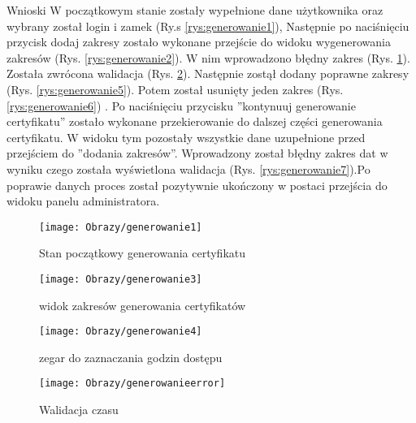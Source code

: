 \begin{enumerate*}
	Wnioski W początkowym stanie zostały wypełnione dane użytkownika oraz wybrany został login i zamek (Ry.s \ref{rys:generowanie1}), Następnie po naciśnięciu przycisk dodaj zakresy zostało wykonane przejście do widoku  wygenerowania zakresów (Rys. \ref{rys:generowanie2}). W nim wprowadzono  błędny zakres (Rys. \ref{rys:generowanie3}). Została zwrócona walidacja (Rys. \ref{rys:generowanie4}). Następnie zostął dodany poprawne zakresy (Rys. \ref{rys:generowanie5}). Potem został usunięty jeden zakres (Rys. \ref{rys:generowanie6})   . Po naciśnięciu przycisku ''kontynuuj generowanie certyfikatu'' zostało wykonane przekierowanie  do dalszej części generowania certyfikatu. W widoku tym pozostały wszystkie dane uzupełnione przed przejściem do ''dodania zakresów''. Wprowadzony został błędny zakres dat w wyniku czego została wyświetlona walidacja (Rys. \ref{rys:generowanie7}).Po poprawie danych proces został pozytywnie ukończony w postaci przejścia do widoku panelu administratora.
	
	
	
		\begin{figure}[ht!]
		
		\begin{minipage}{0.2\textwidth}
			\texttt{[image: Obrazy/generowanie1]}
			\caption{Stan początkowy generowania certyfikatu }
			\label{rys:generowanie1}
		\end{minipage}
	
		
		\begin{minipage}{0.2\textwidth}
			\texttt{[image: Obrazy/generowanie3]}
			\caption{widok zakresów generowania certyfikatów}
			\label{rys:generowanie2}
		\end{minipage}
		\begin{minipage}{0.2\textwidth}
			\texttt{[image: Obrazy/generowanie4]}
			\caption{zegar do zaznaczania godzin dostępu}
			\label{rys:generowanie3}
		\end{minipage}
	\end{figure}


	


	\begin{figure}[ht!]
	
		\begin{minipage}{0.2\textwidth}
		\texttt{[image: Obrazy/generowanieerror]}
		\caption{Walidacja czasu }
		\label{rys:generowanie4}
	\end{minipage}
	

\end{figure}
\end{enumerate*}
